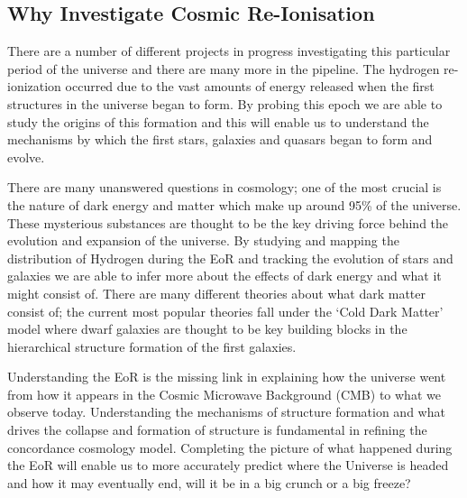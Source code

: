 
\subsection{Why Investigate Cosmic Re-Ionisation} %
\label{sub:why_investigate_cosmic_re_ionisation}
	There are a number of different projects in progress investigating this particular period of the universe and there are many more in the pipeline. The hydrogen re-ionization occurred due to the vast amounts of energy released when the first structures in the universe began to form. By probing this epoch we are able to study the origins of this formation and this will enable us to understand the mechanisms by which the first stars, galaxies and quasars began to form and evolve.

	There are many unanswered questions in cosmology; one of the most crucial is the nature of dark energy and matter which make up around 95\% of the universe\cite{WMAP9}.  These mysterious substances are thought to be the key driving force behind the evolution and expansion of the universe. By studying and mapping the distribution of Hydrogen during the EoR and tracking the evolution of stars and galaxies we are able to infer more about the effects of dark energy and what it might consist of. There are many different theories about what dark matter consist of; the current most popular theories fall under the ‘Cold Dark Matter’ model where dwarf galaxies are thought to be key building blocks in the hierarchical structure formation of the first galaxies\cite{Cignoni}.

	Understanding the EoR is the missing link in explaining how the universe went from how it appears in the Cosmic Microwave Background (CMB) to what we observe today. Understanding the mechanisms of structure formation and what drives the collapse and formation of structure is fundamental in refining the concordance cosmology model. Completing the picture of what happened during the EoR will enable us to more accurately predict where the Universe is headed and how it may eventually end, will it be in a big crunch or a big freeze?


